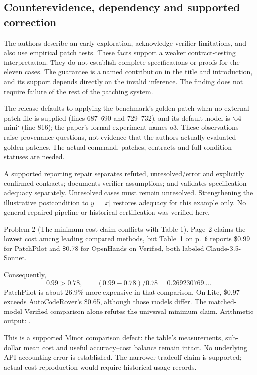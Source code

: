 \documentclass[10pt]{article}
\begin{document}
\subsection*{Counterevidence, dependency and supported correction}
The authors describe an early exploration, acknowledge verifier limitations, and also use empirical patch tests. These facts support a weaker contract-testing interpretation. They do not establish complete specifications or proofs for the eleven cases. The guarantee is a named contribution in the title and introduction, and its support depends directly on the invalid inference. The finding does not require failure of the rest of the patching system.\par
The release defaults to applying the benchmark’s golden patch when no external patch file is supplied (lines 687–690 and 729–732), and its default model is `o4-mini` (line 816); the paper’s formal experiment names o3. These observations raise provenance questions, not evidence that the authors actually evaluated golden patches. The actual command, patches, contracts and full condition statuses are needed.\par
A supported reporting repair separates refuted, unresolved/error and explicitly confirmed contracts; documents verifier assumptions; and validates specification adequacy separately. Unresolved cases must remain unresolved. Strengthening the illustrative postcondition to \(y=|x|\) restores adequacy for this example only. No general repaired pipeline or historical certification was verified here.\par
Problem 2 (The minimum-cost claim conflicts with Table 1).  Page 2 claims the lowest cost among leading compared methods, but Table 1 on p. 6 reports \$0.99 for PatchPilot and \$0.78 for OpenHands on Verified, both labeled Claude-3.5-Sonnet.\par
Consequently, \[0.99>0.78,\qquad (0.99-0.78)/0.78=0.269230769\ldots.\] PatchPilot is about 26.9\% more expensive in that comparison. On Lite, \$0.97 exceeds AutoCodeRover’s \$0.65, although those models differ. The matched-model Verified comparison alone refutes the universal minimum claim. Arithmetic output: .\par
This is a supported Minor comparison defect: the table’s measurements, sub-dollar mean cost and useful accuracy–cost balance remain intact. No underlying API-accounting error is established. The narrower tradeoff claim is supported; actual cost reproduction would require historical usage records.\par
\end{document}
